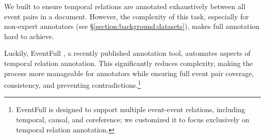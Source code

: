 



We built \App{} to ensure temporal relations are annotated exhaustively between all event pairs in a document. However, the complexity of this task, especially for non-expert annotators (see §\ref{section:background:datasets}), makes full annotation hard to achieve.


Luckily, EventFull \cite{eirew2024eventfullcompleteconsistentevent}, a recently published annotation tool, automates aspects of temporal relation annotation. This significantly reduces complexity, making the process more manageable for annotators while ensuring full event pair coverage, consistency, and preventing contradictions.\footnote{EventFull is designed to support multiple event-event relations, including temporal, causal, and coreference; we customized it to focus exclusively on temporal relation annotation.}

